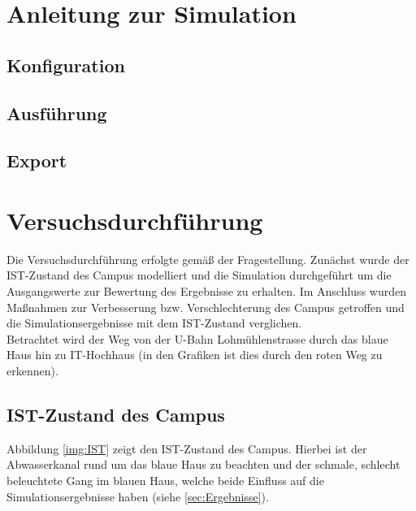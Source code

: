 \documentclass[10pt]{scrartcl}
\author{André Harms, Oliver Steenbuck, Armin Steudte  \\ Carsten Noetzel, Dennis Blauhut, Torben Becker}
\title{\titletext}
\date{11.01.2012}
\begin{document}
\maketitle

\setcounter{tocdepth}{3}
\tableofcontents

	\listoftables                                 												%
	\listoffigures   

\section{Anleitung zur Simulation}
\subsection{Konfiguration}
\subsection{Ausführung}
\subsection{Export}

\section{Versuchsdurchführung}
Die Versuchsdurchführung erfolgte gemäß der Fragestellung. Zunächst wurde der IST-Zustand des Campus modelliert und die Simulation durchgeführt um die Ausgangswerte zur Bewertung des Ergebnisse zu erhalten. Im Anschluss wurden Maßnahmen zur Verbesserung bzw. Verschlechterung des Campus getroffen und die Simulationsergebnisse mit dem IST-Zustand verglichen.\\
Betrachtet wird der Weg von der U-Bahn Lohmühlenstrasse durch das blaue Haus hin zu IT-Hochhaus (in den Grafiken ist dies durch den roten Weg zu erkennen).

\subsection{IST-Zustand des Campus}
Abbildung \ref{img:IST} zeigt den IST-Zustand des Campus. Hierbei ist der Abwasserkanal rund um das blaue Haus zu beachten und der schmale, schlecht beleuchtete Gang im blauen Haus, welche beide Einfluss auf die Simulationsergebnisse haben (siehe \ref{sec:Ergebnisse}).
\end{document}
